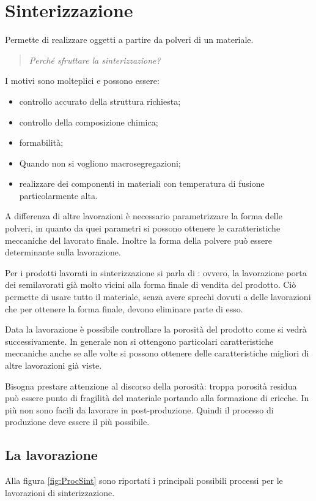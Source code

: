 \chapter{Sinterizzazione}\label{chp:Sinterizzazione}
Permette di realizzare oggetti a partire da polveri di un
materiale.

\begin{quote}
\emph{Perché sfruttare la sinterizzazione?}
\end{quote}

I motivi sono molteplici e possono essere:
\begin{itemize}
\item controllo accurato della struttura richiesta;
\item controllo della composizione chimica;
\item formabilità;
\item Quando non si vogliono macrosegregazioni;
\item realizzare dei componenti in materiali con temperatura di 
fusione particolarmente alta.
\end{itemize}

A differenza di altre lavorazioni è necessario parametrizzare la 
forma delle polveri, in quanto da quei parametri si possono ottenere 
le caratteristiche meccaniche del lavorato finale.
Inoltre la forma della polvere può essere determinante sulla
lavorazione.

Per i prodotti lavorati in sinterizzazione si parla di : ovvero, la lavorazione porta dei semilavorati già molto 
vicini alla forma finale di vendita del prodotto.
Ciò permette di usare tutto il materiale, senza avere sprechi dovuti
a delle lavorazioni che per ottenere la forma finale, devono 
eliminare parte di esso.

Data la lavorazione è possibile controllare la porosità del prodotto
come si vedrà successivamente.
In generale non si ottengono particolari caratteristiche meccaniche
anche se alle volte si possono ottenere delle caratteristiche 
migliori di altre lavorazioni già viste.

Bisogna prestare attenzione al discorso della porosità: troppa
porosità residua può essere punto di fragilità del materiale portando
alla formazione di cricche.
In più non sono facili da lavorare in post-produzione. Quindi il 
processo di produzione deve essere  il più
possibile.

\section{La lavorazione}
Alla figura \ref{fig:ProcSint} sono riportati i principali
possibili processi per le lavorazioni di sinterizzazione.

